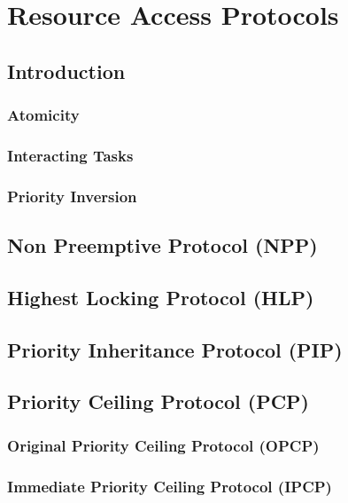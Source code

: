 \chapter{Resource Access Protocols}
\section{Introduction}
\subsection{Atomicity}
\subsection{Interacting Tasks}
\subsection{Priority Inversion}
\section{Non Preemptive Protocol (NPP)}
\section{Highest Locking Protocol (HLP)}
\section{Priority Inheritance Protocol (PIP)}
\section{Priority Ceiling Protocol (PCP)}
\subsection{Original Priority Ceiling Protocol (OPCP)}
\subsection{Immediate Priority Ceiling Protocol (IPCP)}